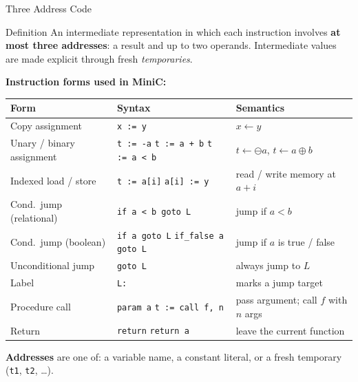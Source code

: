\documentclass[aspectratio=169]{beamer}
\newcommand{\tc}[1]{\texttt{#1}}
\begin{document}
\begin{frame}{Three Address Code}
  \begin{block}{Definition}
    An intermediate representation in which each instruction involves
    \textbf{at most three addresses}: a result and up to two operands.
    Intermediate values are made explicit through fresh \emph{temporaries}.
  \end{block}
\end{frame}

\begin{frame}
  \smallskip
  \textbf{Instruction forms used in MiniC:}
  \begin{center}
    \footnotesize
    \begin{tabular}{lll}
      \toprule
      \textbf{Form}                  & \textbf{Syntax}                    & \textbf{Semantics}                 \\
      \midrule
      Copy assignment                & \tc{x := y}                        & $x \leftarrow y$                   \\
      Unary / binary assignment      & \tc{t := -a} \quad \tc{t := a + b} \quad \tc{t := a < b} & $t \leftarrow \ominus a$, $t \leftarrow a \oplus b$ \\
      Indexed load / store           & \tc{t := a[i]} \quad \tc{a[i] := y} & read / write memory at $a + i$   \\
      Cond.\ jump (relational)       & \tc{if a < b goto L}               & jump if $a < b$                    \\
      Cond.\ jump (boolean)          & \tc{if a goto L} \quad \tc{if\_false a goto L} & jump if $a$ is true / false \\
      Unconditional jump             & \tc{goto L}                        & always jump to $L$                 \\
      Label                          & \tc{L:}                            & marks a jump target                \\
      Procedure call                 & \tc{param a} \quad \tc{t := call f, n} & pass argument; call $f$ with $n$ args \\
      Return                         & \tc{return} \quad \tc{return a}    & leave the current function         \\
      \bottomrule
    \end{tabular}
  \end{center}

  \smallskip
  \textbf{Addresses} are one of: a variable name, a constant literal,
  or a fresh temporary (\tc{t1}, \tc{t2}, \ldots).
\end{frame}
\end{document}
